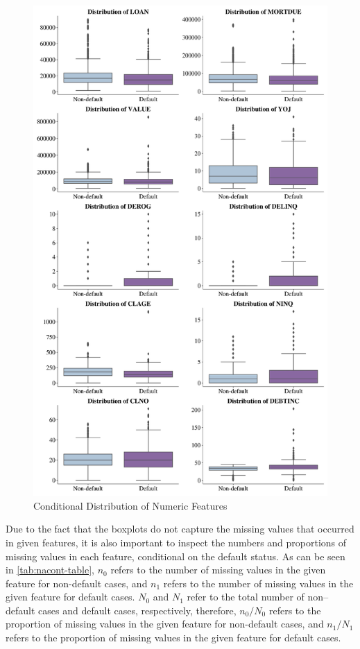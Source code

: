 \begin{figure}[H]
\centering
\caption{Conditional Distribution of Numeric Features}\vspace{0.5em}
\label{fig:boxfeat}
\includegraphics[width=140mm]{Figures/Numeric_Features_Distribution_Boxplots.jpg}

\vspace{-1em}
\end{figure}

Due to the fact that the boxplots do not capture the missing values that occurred in given features, it is also important to inspect the numbers and proportions of missing values in each feature, conditional on the default status.
As can be seen in \autoref{tab:nacont-table}, $n_0$ refers to the number of missing values in the given feature for non-default cases, and $n_1$ refers to the number of missing values in the given feature for default cases.
$N_0$ and $N_1$ refer to the total number of non--default cases and default cases, respectively, therefore, $n_0/N_0$ refers to the proportion of missing values in the given feature for non-default cases, and $n_1/N_1$ refers to the proportion of missing values in the given feature for default cases.



